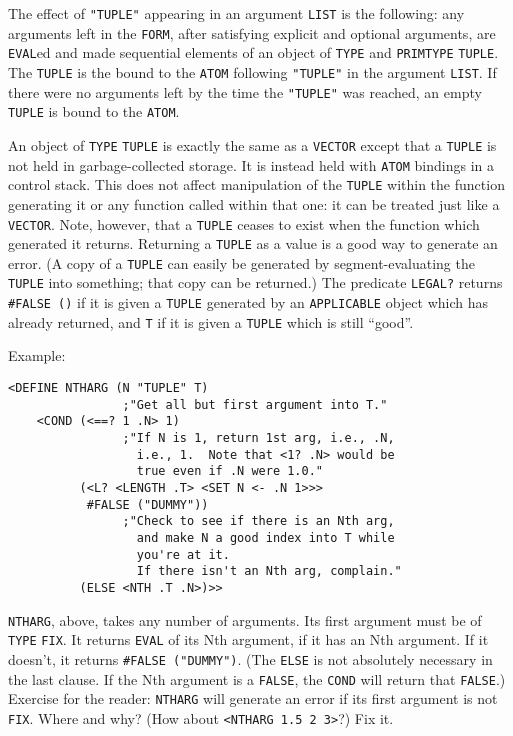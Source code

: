 \documentclass[a4paper]{scrbook}
\begin{document}
The effect of \texttt{"TUPLE"} appearing in an argument \texttt{LIST} is the following: any arguments left in the
\texttt{FORM}, after satisfying explicit and optional arguments, are \texttt{EVAL}ed and made sequential elements of an
object of \texttt{TYPE} and \texttt{PRIMTYPE} \texttt{TUPLE}. The \texttt{TUPLE} is the bound to the \texttt{ATOM}
following \texttt{"TUPLE"} in the argument \texttt{LIST}. If there were no arguments left by the time the \texttt{"TUPLE"}
was reached, an empty \texttt{TUPLE} is bound to the \texttt{ATOM}.

An object of \texttt{TYPE} \texttt{TUPLE} is exactly the same as a \texttt{VECTOR} except that
a \texttt{TUPLE} is not held in garbage-collected storage. It is instead held with \texttt{ATOM} bindings in a control
stack. This does not affect manipulation of the \texttt{TUPLE} within the function generating it or any function called
within that one: it can be treated just like a \texttt{VECTOR}. Note, however, that a \texttt{TUPLE} ceases to exist when
the function which generated it returns. Returning a \texttt{TUPLE} as a value is a good way to generate an error. (A copy
of a \texttt{TUPLE} can easily be generated by segment-evaluating the \texttt{TUPLE} into something; that copy can be
returned.) The predicate \texttt{LEGAL?} returns \texttt{\#FALSE\ ()} if it is given a
\texttt{TUPLE} generated by an \texttt{APPLICABLE} object which has already returned, and \texttt{T} if it is given a
\texttt{TUPLE} which is still ``good''.

Example:

\begin{verbatim}
<DEFINE NTHARG (N "TUPLE" T)
                ;"Get all but first argument into T."
    <COND (<==? 1 .N> 1)
                ;"If N is 1, return 1st arg, i.e., .N,
                  i.e., 1.  Note that <1? .N> would be
                  true even if .N were 1.0."
          (<L? <LENGTH .T> <SET N <- .N 1>>>
           #FALSE ("DUMMY"))
                ;"Check to see if there is an Nth arg,
                  and make N a good index into T while
                  you're at it.
                  If there isn't an Nth arg, complain."
          (ELSE <NTH .T .N>)>>
\end{verbatim}

\texttt{NTHARG}, above, takes any number of arguments. Its first argument must be of \texttt{TYPE} \texttt{FIX}. It returns
\texttt{EVAL} of its Nth argument, if it has an Nth argument. If it doesn't, it returns \texttt{\#FALSE\ ("DUMMY")}. (The
\texttt{ELSE} is not absolutely necessary in the last clause. If the Nth argument is a \texttt{FALSE}, the \texttt{COND}
will return that \texttt{FALSE}.) Exercise for the reader: \texttt{NTHARG} will generate an error if its first argument is
not \texttt{FIX}. Where and why? (How about \texttt{\textless{}NTHARG\ 1.5\ 2\ 3\textgreater{}}?) Fix it.
\end{document}
